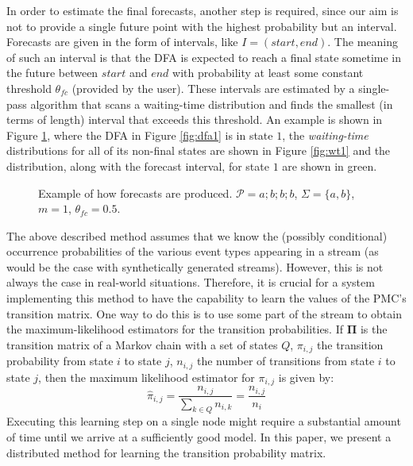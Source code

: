 In order to estimate the final forecasts, another step is required,
since our aim is not to provide a single future point with the highest probability but an interval. 
Forecasts are given in the form of intervals, like $I=(\mathit{start},\mathit{end})$. 
The meaning of such an interval is that the DFA is expected to reach a final state sometime in the future between $\mathit{start}$ and $\mathit{end}$ with probability at least some constant threshold $\theta_{fc}$ (provided by the user). 
These intervals are estimated by a single-pass algorithm that scans a waiting-time distribution and finds the smallest (in terms of length) interval that exceeds this threshold. 
An example is shown in Figure \ref{fig:wtdfas},
where the DFA in Figure \ref{fig:dfa1} is in state $1$,
the \textit{waiting-time} distributions for all of its non-final states are shown in Figure \ref{fig:wt1}
and the distribution, along with the forecast interval, for state $1$ are shown in green.
\begin{figure}[!ht]
\begin{centering}
\caption{Example of how forecasts are produced. 
$\mathcal{P}=a ; b ; b ; b$, $\Sigma=\{a,b\}$, $m=1$, $\theta_{\mathit{fc}}=0.5$.}
\label{fig:wtdfas}
\end{centering}
\end{figure}

The above described method assumes that we know the (possibly conditional) occurrence probabilities of the various event types appearing in a stream
(as would be the case with synthetically generated streams).
However, this is not always the case in real-world situations.
Therefore, it is crucial for a system implementing this method to have the capability to learn the values of the PMC's transition matrix.
One way to do this is to use some part of the stream to obtain the maximum-likelihood estimators for the transition probabilities. 
If $\boldsymbol{\Pi}$ is the transition matrix of a Markov chain with a set of states $Q$, 
$\pi_{i,j}$ the transition probability from state $i$ to state $j$,
$n_{i,j}$ the number of transitions from state $i$ to state $j$,
then the maximum likelihood estimator for $\pi_{i,j}$ is given by:
\begin{equation*}
\label{eq:pi_estim}
\hat{\pi}_{i,j}=\frac{n_{i,j}}{\sum_{k \in Q} n_{i,k}}=\frac{n_{i,j}}{n_{i}}
\end{equation*}
Executing this learning step on a single node might require a substantial amount of time until we arrive at a sufficiently good model.
In this paper, we present a distributed method for learning the transition probability matrix.

